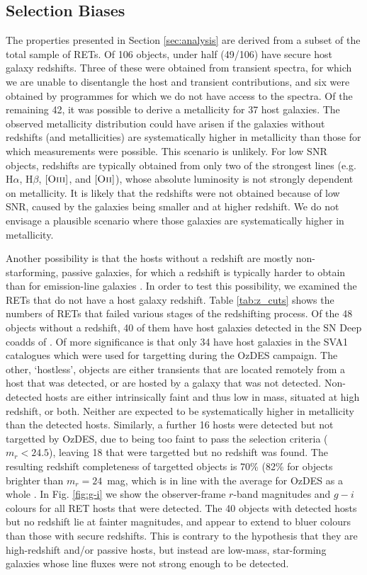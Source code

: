 \documentclass[fleqn,usenatbib,]{mnras}
\newcommand{\halpha}[0]{H$\alpha$}
\newcommand{\hbeta}[0]{H$\beta$}
\newcommand{\OII}[0]{$[\textnormal{\textsc{Oii}}]$}
\newcommand{\OIII}[0]{$[\textnormal{\textsc{Oiii}}]$}
\begin{document}
\subsection{Selection Biases \label{subsec:disc_bias}}
The properties presented in Section \ref{sec:analysis} are derived from a subset of the total sample of RETs. Of 106 objects, under half (49/106) have secure host galaxy redshifts. Three of these were obtained from transient spectra, for which we are unable to disentangle the host and transient contributions, and six were obtained by programmes for which we do not have access to the spectra. Of the remaining 42, it was possible to derive a metallicity for 37 host galaxies. The observed metallicity distribution could have arisen if the galaxies without redshifts (and metallicities) are systematically higher in metallicity than those for which measurements were possible. This scenario is unlikely. For low SNR objects, redshifts are typically obtained from only two of the strongest lines (e.g. \halpha, \hbeta, \OIII, and \OII), whose absolute luminosity is not strongly dependent on metallicity. It is likely that the redshifts were not obtained because of low SNR, caused by the galaxies being smaller and at higher redshift. We do not envisage a plausible scenario where those galaxies are systematically higher in metallicity.

Another possibility is that the hosts without a redshift are mostly non-starforming, passive galaxies, for which a redshift is typically harder to obtain than for emission-line galaxies \citep{Yuan2015,Childress2017,Lidman2020}. In order to test this possibility, we examined the RETs that do not have a host galaxy redshift. Table \ref{tab:z_cuts} shows the numbers of RETs that failed various stages of the redshifting process. Of the 48 objects without a redshift, 40 of them have host galaxies detected in the SN Deep coadds of \citet{Wiseman2020}. Of more significance is that only 34 have host galaxies in the SVA1 catalogues which were used for targetting during the OzDES campaign. The other, `hostless', objects are either transients that are located remotely from a host that was detected, or are hosted by a galaxy that was not detected. Non-detected hosts are either intrinsically faint and thus low in mass, situated at high redshift, or both. Neither are expected to be systematically higher in metallicity than the detected hosts. Similarly, a further 16 hosts were detected but not targetted by OzDES, due to being too faint to pass the selection criteria ($m_r < 24.5$), leaving 18 that were targetted but no redshift was found. The resulting redshift completeness of targetted objects is 70\% (82\% for objects brighter than $m_r = 24$~mag, which is in line with the average for OzDES as a whole \citep{Lidman2020}.
In Fig. \ref{fig:g-i} we show the observer-frame $r$-band magnitudes and $g-i$ colours for all RET hosts that were detected. The 40 objects with detected hosts but no redshift lie at fainter magnitudes, and appear to extend to bluer colours than those with secure redshifts. This is contrary to the hypothesis that they are high-redshift and/or passive hosts, but instead are low-mass, star-forming galaxies whose line fluxes were not strong enough to be detected.
 
\end{document}
